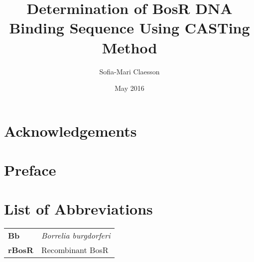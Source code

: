 \documentclass[12pt,twoside]{reedthesis}
\title{Determination of BosR DNA Binding Sequence Using CASTing Method}
\author{Sofia-Mari Claesson}
\date{May 2016}
\begin{document}
  \maketitle
  \frontmatter %
  \pagestyle{empty} %
  
  \newcommand{\sofiachapter}[1]{
  	\chapter*{#1}
  	\addcontentsline{toc}{chapter}{#1}
  	\chaptermark{#1}
  	\markboth{#1}{#1}
  }
  
    \setcounter{secnumdepth}{0}

    \chapter*{Acknowledgements}

    \chapter*{Preface}
	
	

    \chapter*{List of Abbreviations}

	\begin{table}[h]
	\centering %
	\begin{tabular}{ll}
		\textbf{Bb}  	&  \textit{Borrelia burgdorferi} \\
		\textbf{rBosR}  	&  Recombinant BosR\\
	\end{tabular}
	\end{table}
	
\end{document}
